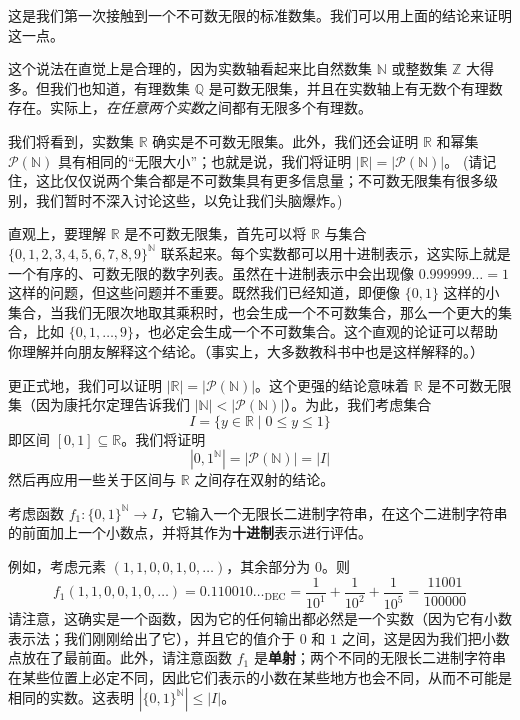 \begin{example}

    这是我们第一次接触到一个不可数无限的标准数集。我们可以用上面的结论来证明这一点。

    这个说法在直觉上是合理的，因为实数轴看起来比自然数集 $\mathbb{N}$ 或整数集 $\mathbb{Z}$ 大得多。但我们也知道，有理数集 $\mathbb{Q}$ 是可数无限集，并且在实数轴上有无数个有理数存在。实际上，\emph{在任意两个实数}之间都有无限多个有理数。

    我们将看到，实数集 $\mathbb{R}$ 确实是不可数无限集。此外，我们还会证明 $\mathbb{R}$ 和幂集 $\mathcal{P}(\mathbb{N})$ 具有相同的``无限大小''；也就是说，我们将证明 $|\mathbb{R}| = |\mathcal{P}(\mathbb{N})|$。 (请记住，这比仅仅说两个集合都是不可数集具有更多信息量；不可数无限集有很多级别，我们暂时不深入讨论这些，以免让我们头脑爆炸。)

    直观上，要理解 $\mathbb{R}$ 是不可数无限集，首先可以将 $\mathbb{R}$ 与集合 $\{0, 1, 2, 3, 4, 5, 6, 7, 8, 9\}^\mathbb{N}$ 联系起来。每个实数都可以用十进制表示，这实际上就是一个有序的、可数无限的数字列表。虽然在十进制表示中会出现像 $0.999999 \dots = 1$ 这样的问题，但这些问题并不重要。既然我们已经知道，即便像 $\{0, 1\}$ 这样的小集合，当我们无限次地取其乘积时，也会生成一个不可数集合，那么一个更大的集合，比如 $\{0, 1, \dots , 9\}$，也必定会生成一个不可数集合。这个直观的论证可以帮助你理解并向朋友解释这个结论。（事实上，大多数教科书中也是这样解释的。）

    更正式地，我们可以证明 $|\mathbb{R}| = |\mathcal{P}(\mathbb{N})|$。这个更强的结论意味着 $\mathbb{R}$ 是不可数无限集（因为康托尔定理告诉我们 $|\mathbb{N}| < |\mathcal{P}(\mathbb{N})|$）。为此，我们考虑集合
    \[I = \{y \in \mathbb{R} \mid 0 \le y \le 1\}\]
    即区间 $[0, 1] \subseteq \mathbb{R}$。我们将证明
    \[|{0, 1}^\mathbb{N}| = |\mathcal{P}(\mathbb{N})| = |I|\]
    然后再应用一些关于区间与 $\mathbb{R}$ 之间存在双射的结论。

    考虑函数 $f_1 : \{0, 1\}^{\mathbb{N}} \to I$，它输入一个无限长二进制字符串，在这个二进制字符串的前面加上一个小数点，并将其作为\textbf{十进制}表示进行评估。

    例如，考虑元素 $(1, 1, 0, 0, 1, 0, \dots)$，其余部分为 $0$。则
    \[f_1(1, 1, 0, 0, 1, 0, \dots) = 0.110010 \dots _\text{DEC} = \frac{1}{10^1}+\frac{1}{10^2}+\frac{1}{10^5} = \frac{11001}{100000}\]
    请注意，这确实是一个函数，因为它的任何输出都必然是一个实数（因为它有小数表示法；我们刚刚给出了它），并且它的值介于 $0$ 和 $1$ 之间，这是因为我们把小数点放在了最前面。此外，请注意函数 $f_1$ 是\textbf{单射}；两个不同的无限长二进制字符串在某些位置上必定不同，因此它们表示的小数在某些地方也会不同，从而不可能是相同的实数。这表明 $|\{0,1\}^{\mathbb{N}}| \le |I|$。


\end{example}
